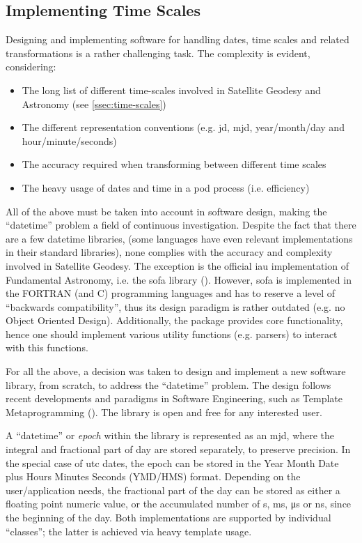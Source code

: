 \subsection{Implementing Time Scales}\label{ssec:time-scales-implementation}

Designing and implementing software for handling dates, time scales and related transformations 
is a rather challenging task. The complexity is evident, considering:
\begin{itemize}
    \item The long list of different time-scales involved in Satellite Geodesy and 
        Astronomy (see \ref{ssec:time-scales})
    \item The different representation conventions (e.g. \gls{jd}, \gls{mjd}, year/month/day and hour/minute/seconds)
    \item The accuracy required when transforming between different time scales 
    \item The heavy usage of dates and time in a \gls{pod} process (i.e. efficiency)
\end{itemize}

All of the above must be taken into account in software design, making the ``datetime'' 
problem a field of continuous investigation. Despite the fact that there are a few datetime libraries, 
(some languages have even relevant implementations in their standard libraries), none 
complies with the accuracy and complexity involved in Satellite Geodesy. The exception 
is the official \gls{iau} implementation of Fundamental Astronomy, i.e. the \gls{sofa} 
library (\cite{sofa2021}). However, \gls{sofa} is implemented in the FORTRAN (and C) 
programming languages and has to reserve a level of ``backwards compatibility'', thus 
its design paradigm is rather outdated (e.g. no Object Oriented Design). Additionally, 
the package provides core functionality, hence one should implement various utility functions 
(e.g. parsers) to interact with this functions.

For all the above, a decision was taken to design and implement a new software library, 
from scratch, to address the ``datetime'' problem. The design follows recent developments 
and paradigms in Software Engineering, such as Template Metaprogramming 
(\cite{Vandevoorde2017}). The library is open and free for any interested user.

A ``datetime'' or \emph{epoch} within the library is represented as an \gls{mjd}, 
where the integral and fractional part of day are stored separately, to preserve 
precision. In the special case of \gls{utc} dates, the epoch can be stored in the 
Year Month Date plus Hours Minutes Seconds (YMD/HMS) format. Depending on the user/application 
needs, the fractional part of the day can be stored as either a floating point numeric 
value, or the accumulated number of \si{\second}, \si{\milli\second}, \si{\micro\second} or 
\si{\nano\second}, since the beginning of the day. Both implementations are supported by 
individual ``classes''; the latter is achieved via heavy template usage. 

